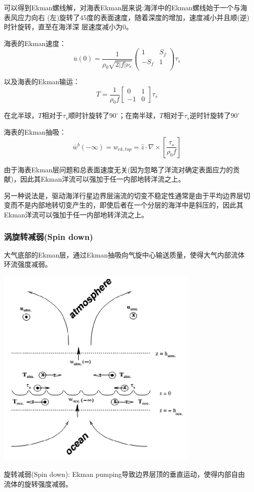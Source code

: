 \documentclass{article}
\begin{document}
可以得到Ekman螺线解，对海表Ekman层来说:海洋中的Ekman螺线始于一个与海表风应力向右
(左)旋转了$45$度的表面速度，随着深度的增加，速度减小并且顺(逆)时针旋转，直至在海洋深
层速度减小为$0$。

海表的Ekman速度：
$$\overline{u}(0)=\frac{1}{{{\rho }_{0}}\sqrt{2\left| f \right|{{\nu }_{e}}}}\left( \begin{matrix}
   1 & {{S}_{f}}  \\
   -{{S}_{f}} & 1  \\
\end{matrix} \right){{\tau }_{s}}$$

以及海表的Ekman输运：
$$T=\frac{1}{\rho_0f}\begin{bmatrix}
    0& 1\\
    -1& 0
\end{bmatrix}\tau_s$$

在北半球，$T$相对于$\tau_s$顺时针旋转了$90^{\circ}$；在南半球，$T$相对于$\tau_s$逆时针旋转了$90^{\circ}$

海表的Ekman抽吸：
$${{\overline{w}}^{b}}(-\infty )={{w}_{ek,top}}=\widehat{z}\cdot \nabla \times \left[ \frac{{{\tau }_{s}}}{{{\rho }_{0}}f} \right]$$

由于海表Ekman层问题和总表面速度无关(因为忽略了洋流对确定表面应力的贡献)，因此其Ekman洋流可以强加于任一内部地转洋流之上。

另一种说法是，驱动海洋行星边界层湍流的切变不稳定性通常是由于平均边界层切变而不是内部地转切变产生的，即使后者在一个分层的海洋中是斜压的，因此其Ekman洋流可以强加于任一内部地转洋流之上。

\subsubsection{涡旋转减弱(Spin down)}
大气底部的Ekman层，通过Ekman抽吸向气旋中心输送质量，使得大气内部流体环流强度减弱。
\begin{center}
    \includegraphics[width=10cm]{Fig5_2.png}
\end{center}
旋转减弱(Spin down): Ekman pumping导致边界层顶的垂直运动，使得内部自由流体的旋转强度减弱。
\end{document}
